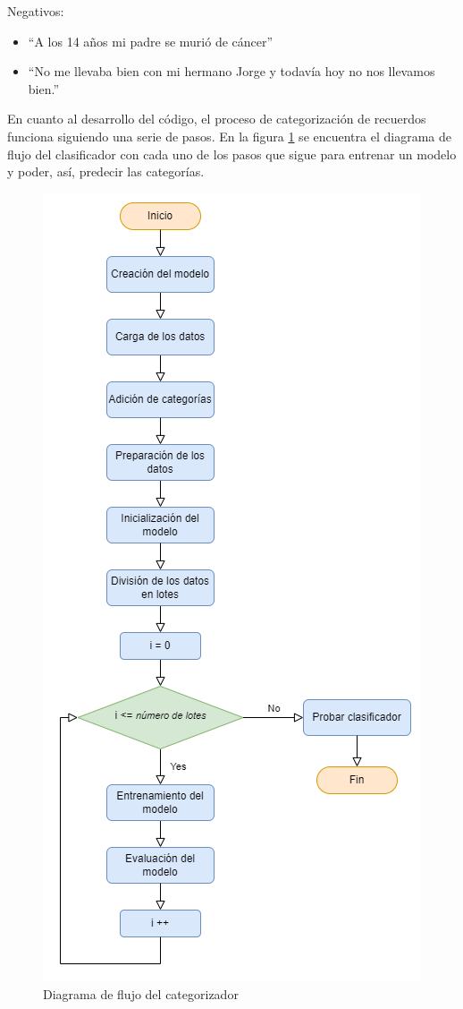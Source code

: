 Negativos:
\begin{itemize}
	\item ``A los 14 años mi padre se murió de cáncer''
	\item ``No me llevaba bien con mi hermano Jorge y todavía hoy no nos llevamos bien.''
\end{itemize}

En cuanto al desarrollo del código, el proceso de categorización de recuerdos funciona siguiendo una serie de pasos. En la figura \ref{fig:flujo_cat} se encuentra el diagrama de flujo del clasificador con cada uno de los pasos que sigue para entrenar un modelo y poder, así, predecir las categorías. 

\begin{figure}
	\centering
	\includegraphics[scale=0.7]{Imagenes/Vectorial/diagrama_flujo_categorizador}
	\caption{Diagrama de flujo del categorizador}
	\label{fig:flujo_cat}
\end{figure}

